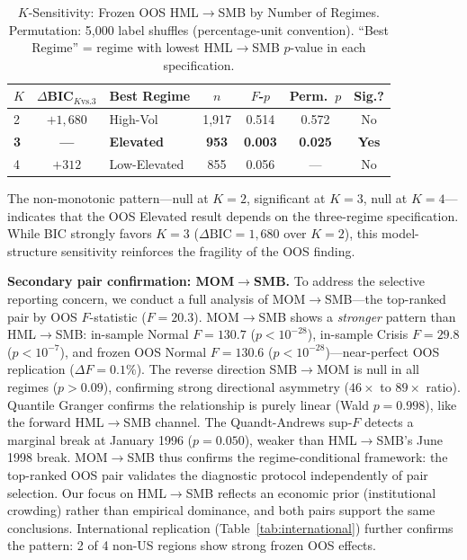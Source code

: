 \documentclass[sigconf,anonymous]{acmart}
\begin{document}
\begin{table}[t]
\centering
\caption{$K$-Sensitivity: Frozen OOS HML$\to$SMB by Number of Regimes.
Permutation: 5{,}000 label shuffles (percentage-unit convention).
``Best Regime'' = regime with lowest HML$\to$SMB $p$-value in each specification.}
\label{tab:k_sensitivity}
\scriptsize
\begin{tabular}{@{}lclcccc@{}}
\toprule
$K$ & $\Delta$BIC$_{K\text{vs.}3}$ & Best Regime & $n$ & $F$-$p$ & Perm.\ $p$ & Sig.? \\
\midrule
2 & $+1{,}680$ & High-Vol & 1{,}917 & 0.514 & 0.572 & No \\
\textbf{3} & \textbf{---} & \textbf{Elevated} & \textbf{953} & \textbf{0.003} & \textbf{0.025} & \textbf{Yes} \\
4 & $+312$ & Low-Elevated & 855 & 0.056 & --- & No \\
\bottomrule
\end{tabular}
\end{table}

The non-monotonic pattern---null at $K = 2$, significant at $K = 3$, null at $K = 4$---indicates that the OOS Elevated result depends on the three-regime specification. While BIC strongly favors $K = 3$ ($\Delta\text{BIC} = 1{,}680$ over $K = 2$), this model-structure sensitivity reinforces the fragility of the OOS finding.

\textbf{Secondary pair confirmation: MOM$\to$SMB.}
To address the selective reporting concern, we conduct a full analysis
of MOM$\to$SMB---the top-ranked pair by OOS $F$-statistic ($F = 20.3$).
MOM$\to$SMB shows a \emph{stronger} pattern than HML$\to$SMB:
in-sample Normal $F = 130.7$ ($p < 10^{-28}$), in-sample Crisis
$F = 29.8$ ($p < 10^{-7}$), and frozen OOS Normal $F = 130.6$
($p < 10^{-28}$)---near-perfect OOS replication ($\Delta F = 0.1\%$).
The reverse direction SMB$\to$MOM is null in all regimes ($p > 0.09$),
confirming strong directional asymmetry ($46\times$ to $89\times$ ratio).
Quantile Granger confirms the relationship is purely linear
(Wald $p = 0.998$), like the forward HML$\to$SMB channel.
The Quandt-Andrews sup-$F$ detects a marginal break at January 1996
($p = 0.050$), weaker than HML$\to$SMB's June 1998 break.
MOM$\to$SMB thus confirms the regime-conditional framework:
the top-ranked OOS pair validates the diagnostic protocol
independently of pair selection.
Our focus on HML$\to$SMB reflects an economic prior
(institutional crowding) rather than empirical dominance,
and both pairs support the same conclusions.
International replication
(Table~\ref{tab:international}) further confirms the pattern:
2 of 4 non-US regions show strong frozen OOS effects.
\end{document}

